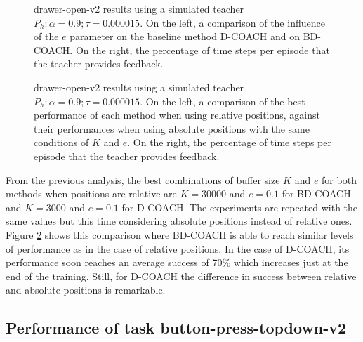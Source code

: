  \begin{figure}[H]
  \centering
   \hfill
  \caption{drawer-open-v2 results using a simulated teacher $P_h: \alpha = 0.9; \tau =  0.000015$. On the left, a comparison of the influence of the $e$ parameter on the baseline method D-COACH and on BD-COACH. On the right, the percentage of time steps per episode that the teacher  provides feedback.}
  \label{fig:results_drawer-open-same-buffer}
\end{figure}





 \begin{figure}[H]
  \centering

  \caption{drawer-open-v2 results using a simulated teacher $P_h: \alpha = 0.9; \tau =  0.000015$. On the left, a comparison of the best performance of each method when using relative positions, against their performances when using absolute positions with the same conditions of $K$ and $e$. On the right, the percentage of time steps per episode that the teacher  provides feedback.}
  \label{fig:results_drawer-open-best}
\end{figure}





From the previous analysis, the best combinations of buffer size $K$ and $e$ for both methods when positions are relative are $K=30000$ and $e=0.1$ for BD-COACH and $K=3000$ and $e=0.1$ for D-COACH. The experiments are repeated with the same values but this time considering absolute positions instead of relative ones. Figure \ref{fig:results_drawer-open-best}  shows this comparison where BD-COACH is able to reach similar levels of performance as in the case of relative positions. In the case of D-COACH, its performance soon reaches an average success of 70\% which increases just at the end of the training. Still, for D-COACH the difference in success between relative and absolute positions is remarkable.


\subsection{Performance of task button-press-topdown-v2}
\label{subsection:Performance of task button-press-topdown-v2}


